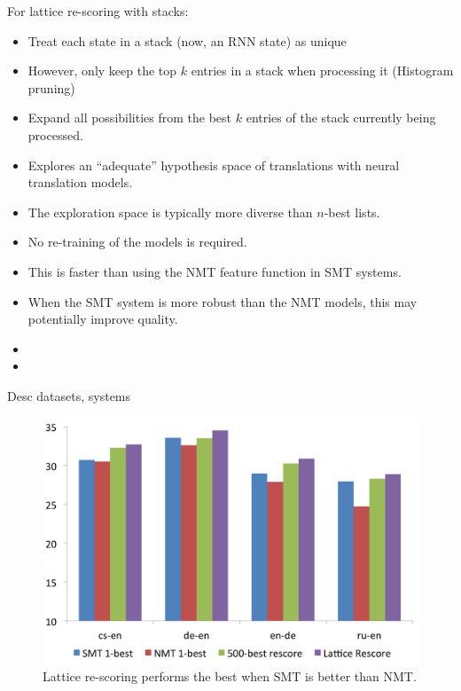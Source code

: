 \documentclass[landscape]{jhuslides3C}
\begin{document}
\vspace{10mm}
For lattice re-scoring with stacks:
\begin{itemize}
\item Treat each state in a stack (now, an RNN state) as unique
\item However, only keep the top $k$ entries in a stack when processing it (Histogram pruning)
\item Expand all possibilities from the best $k$ entries of the stack currently being processed.
\end{itemize}

\begin{itemize}
\item Explores an ``adequate'' hypothesis space of translations with neural translation models.
\item The exploration space is typically more diverse than $n$-best lists.
\item No re-training of the models is required.
\item This is faster than using the NMT feature function in SMT systems.
\item When the SMT system is more robust than the NMT models, this may potentially improve quality.
\end{itemize}

\vspace{10mm}
\begin{itemize}
\item
\item
\end{itemize}
Desc datasets, systems

\begin{figure}
\begin{center}
\includegraphics[scale=0.7]{images/smtBetter.png}
\caption{Lattice re-scoring performs the best when SMT is better than NMT.}
\end{center}
\end{figure}
\end{document}
